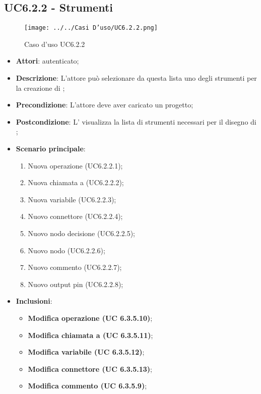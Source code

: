 \subsection{UC6.2.2 - Strumenti }
\label{ssec:UC6.2.2}
\begin{figure}[H]
\centering
\texttt{[image: ../../Casi D'uso/UC6.2.2.png]}
\caption{Caso d'uso UC6.2.2}
 \end{figure}
\begin{itemize}
\item \textbf{Attori}:  autenticato;
\item \textbf{Descrizione}: L'attore può selezionare da questa lista uno degli strumenti per la creazione di ;
\item \textbf{Precondizione}: L'attore deve aver caricato un progetto;
\item \textbf{Postcondizione}: L' visualizza la lista di strumenti necessari per il disegno di ;
\item \textbf{Scenario principale}: \begin{enumerate}\item Nuova operazione (UC6.2.2.1);\item Nuova chiamata a  (UC6.2.2.2);\item Nuova variabile (UC6.2.2.3);\item Nuovo connettore (UC6.2.2.4);\item Nuovo nodo decisione (UC6.2.2.5);\item Nuovo nodo  (UC6.2.2.6);\item Nuovo commento (UC6.2.2.7);\item Nuovo output pin (UC6.2.2.8);
 \end{enumerate}
 \item \textbf{Inclusioni}: \begin{itemize}
 \item \textbf{ Modifica operazione (UC 6.3.5.10)};
 \item \textbf{ Modifica chiamata a  (UC 6.3.5.11)};
 \item \textbf{ Modifica variabile (UC 6.3.5.12)};
  \item \textbf{ Modifica connettore (UC 6.3.5.13)};
  \item \textbf{ Modifica commento (UC 6.3.5.9)};
 \end{itemize}

\end{itemize}
